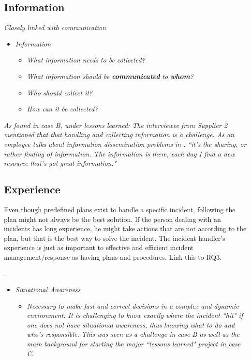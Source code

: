 \subsection{Information}
\textit{Closely linked with communication}

\begin{itemize}
\item \textit{Information}
\begin{itemize}
\item \textit{What information needs to be collected?}
\item \textit{What information should be \textbf{communicated} to \textbf{whom}?}
\item \textit{Who should collect it?}
\item \textit{How can it be collected?}
\end{itemize}
\end{itemize}

\textit{As found in case B, under lessons learned:
The interviewee from Supplier 2 mentioned that that handling and collecting information is a challenge. As an employee talks about information dissemination problems in \cite{ahmad2012incident}.
``it's the sharing, or rather finding of information. The information is there, each day I find a new resource that's got great information."}

\subsection{Experience}

Even though predefined plans exist to handle a specific incident, following the plan might not always be the best solution. If the person dealing with an incidents has long experience, he might take actions that are not according to the plan, but that is the best way to solve the incident. The incident handler's experience is just as important to effective and efficient incident management/response as having plans and procedures. Link this to RQ3.

.

\begin{itemize}
\item \textit{Situational Awareness}
\begin{itemize}
\item\textit{ Necessary to make fast and correct decisions in a complex and dynamic environment. It is challenging to know exactly where the incident ``hit" if one does not have situational awareness, thus knowing what to do and who's responsible. This was  seen as a challenge in case B as well as the main background for starting the major ``lessons learned" project in case C.}
\end{itemize}
\end{itemize}

